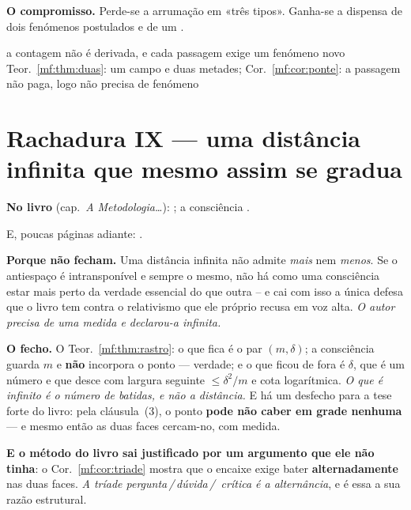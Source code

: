 \documentclass[../livro.tex]{subfiles}
\begin{document}
\medskip\noindent\textbf{O compromisso.} Perde-se a arrumação em «três tipos».
Ganha-se a dispensa de dois fenómenos postulados e de um .

      {a contagem não é derivada, e cada passagem exige um fenómeno novo}
      {Teor.~\ref{mf:thm:duas}: um campo e duas metades; Cor.~\ref{mf:cor:ponte}:
       a passagem não paga, logo não precisa de fenómeno}

\section{Rachadura IX --- uma distância infinita que mesmo assim se gradua}\label{mf:r9}

\noindent\textbf{No livro} (cap.~\emph{A Metodologia\dots}): ; a consciência .

\noindent E, poucas páginas adiante: .

\medskip\noindent\textbf{Porque não fecham.} Uma distância infinita não admite
\emph{mais} nem \emph{menos}. Se o antiespaço é intransponível e sempre o mesmo,
não há como uma consciência estar mais perto da verdade essencial do que outra --
e cai com isso a única defesa que o livro tem contra o relativismo que ele
próprio recusa em voz alta. \emph{O autor precisa de uma medida e declarou-a
infinita.}

\medskip\noindent\textbf{O fecho.} O Teor.~\ref{mf:thm:rastro}: o que fica é o
par $(m,\delta)$; a consciência guarda $m$ e \textbf{não} incorpora o ponto ---
verdade; e o que ficou de fora é $\delta$, que é um número e que desce com
largura seguinte $\le\delta^2/m$ e cota logarítmica. \emph{O que é infinito é o
número de batidas, e não a distância.} E há um desfecho para a tese forte do
livro: pela cláusula~(3), o ponto \textbf{pode não caber em grade nenhuma} --- e
mesmo então as duas faces cercam-no, com medida.

\medskip\noindent\textbf{E o método do livro sai justificado por um argumento que
ele não tinha}: o Cor.~\ref{mf:cor:triade} mostra que o encaixe exige bater
\textbf{alternadamente} nas duas faces. \emph{A tríade pergunta\,/\,dúvida\,/\,
crítica é a alternância}, e é essa a sua razão estrutural.
\end{document}
